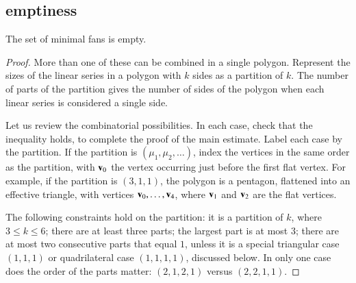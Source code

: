\subsection{emptiness}

\begin{lemma}\label{lemma:min-empty}  
The set of minimal fans is empty.
\end{lemma}


\begin{proof}
More than one of these can be combined in a single polygon.   Represent the sizes of the linear series in a polygon with $k$ sides as a partition of $k$.
The number of parts of the partition gives the number of sides of the polygon when each linear series is considered a single side. 
%

Let us review the combinatorial possibilities.  In each case,  check that the inequality holds, to complete the proof of the main estimate.  Label each 
case by the partition.  If the partition is $(\mu_1,\mu_2,\ldots)$, 
index the vertices in the same order as the partition, with ${\mathbf v}_0$
the vertex occurring just before the first flat vertex.  For example,
if the partition is $(3,1,1)$, the polygon is a pentagon, flattened into
an effective triangle, with vertices ${\mathbf v}_0,\ldots,{\mathbf v}_4$, where ${\mathbf v}_1$ and ${\mathbf v}_2$
are the flat vertices.
%

The following constraints hold on the partition: it is
a partition of $k$, where $3\le k\le 6$; there
are at least three parts; the largest part is at most $3$;  there are
at most two consecutive parts that equal $1$, unless it is a special triangular case $(1,1,1)$ or
quadrilateral case $(1,1,1,1)$, discussed below.  In only one case
does the order of the parts matter: $(2,1,2,1)$ versus $(2,2,1,1)$.


\end{proof}
